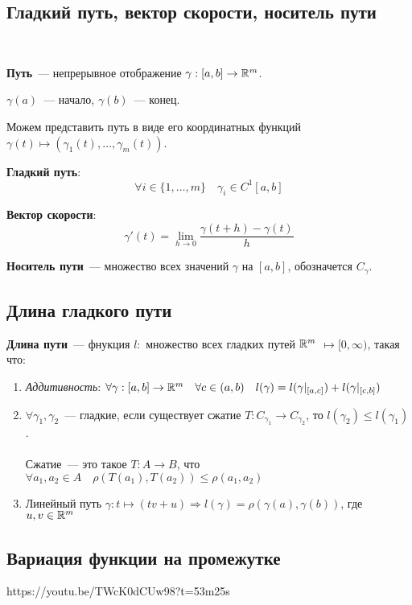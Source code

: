 \documentclass[../main.tex]{subfiles}
\begin{document}
\subsection{Гладкий путь, вектор скорости, носитель пути}
~

\textbf{Путь}~--- непрерывное отображение $\gamma:[a,b]\to\mathbb{R}^m$.

$\gamma(a)$~--- начало, $\gamma(b)$~--- конец.

Можем представить путь в виде его координатных функций $\gamma(t)\mapsto(\gamma_1(t), \dots, \gamma_m(t))$.

\textbf{Гладкий путь}:
\begin{equation*}
    \forall i \in \{1,\dots,m\} \quad \gamma_i\in C^1 [a,b]
\end{equation*}

\textbf{Вектор скорости}:
\begin{equation*}
    \gamma'(t)=\lim_{h \to 0}\frac{\gamma(t+h)-\gamma(t)}{h}
\end{equation*}

\textbf{Носитель пути}~--- множество всех значений $\gamma$ на $[a,b]$, обозначется $C_\gamma$. 

\subsection{Длина гладкого пути}
\textbf{Длина пути}~--- фнукция $l:$ множество всех гладких путей $\mathbb{R}^m$ $\mapsto [0, \infty)$, такая что:
\begin{enumerate}
    \item \textit{Аддитивность}: $\forall \gamma:[a,b]\to\mathbb{R}^m \quad \forall c\in(a,b) \quad l(\gamma)=l(\gamma|_{[a,c]})+l(\gamma|_{[c,b]})$
    \item $\forall \gamma_1, \gamma_2$~--- гладкие, если существует сжатие $T:C_{\gamma_1}\to C_{\gamma_2}$, то $l(\gamma_2)\le l(\gamma_1)$.\\\\
    Сжатие~--- это такое $T:A\to B$, что $\forall a_1, a_2\in A \quad \rho(T(a_1),T(a_2))\le\rho(a_1, a_2)$
    \item Линейный путь $\gamma:t\mapsto(tv+u) \Rightarrow l(\gamma)=\rho(\gamma(a), \gamma(b))$, где $u,v\in\mathbb{R}^m$
\end{enumerate}

\subsection{Вариация функции на промежутке}
https://youtu.be/TWcK0dCUw98?t=53m25s
\end{document}
